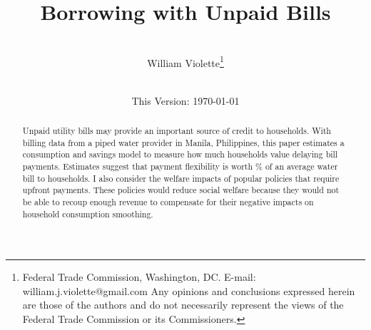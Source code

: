 \documentclass[12pt]{article}
\begin{document}
\begin{titlepage} 
\title{{Borrowing with Unpaid Bills}}
\author{\\[3em]
  William Violette\thanks{Federal Trade Commission, Washington, DC. E-mail: william.j.violette@gmail.com   Any opinions and conclusions expressed herein are those of the authors and do not necessarily represent the views of the Federal Trade Commission or its Commissioners.} \\
 \\ 
  }
\vspace{30mm}
\date{\vspace{5mm}This Version: \today}
\maketitle
\begin{abstract}


Unpaid utility bills may provide an important source of credit to households.  With billing data from a piped water provider in Manila, Philippines, this paper estimates a consumption and savings model to measure how much households value delaying bill payments.  Estimates suggest that payment flexibility is worth \unskip\% of an average water bill to households.  I also consider the welfare impacts of popular policies that require upfront payments.  These policies would reduce social welfare because they would not be able to recoup enough revenue to compensate for their negative impacts on household consumption smoothing.



\end{abstract}
\end{titlepage}
\end{document}
